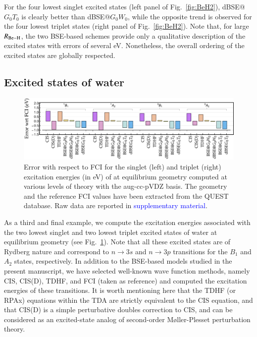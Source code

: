 \documentclass[aip,jcp,reprint,noshowkeys,superscriptaddress]{revtex4-1}
\newcommand{\SupMat}{\textcolor{blue}{supplementary material}}
\begin{document}
For the four lowest singlet excited states (left panel of Fig.~\ref{fig:BeH2}), dBSE@$G_0T_0$ is clearly better than dBSE@$G_0W_0$, while the opposite trend is observed for the four lowest triplet states (right panel of Fig.~\ref{fig:BeH2}).
Note that, for large $R_{\ce{Be-H}}$, the two BSE-based schemes provide only a qualitative description of the excited states with errors of several \si{\eV}.
Nonetheless, the overall ordering of the excited states are globally respected.

\subsection{Excited states of water}
\label{sec:H2O}

\begin{figure}
	\includegraphics[width=\linewidth]{fig6}
	\caption{Error with respect to FCI for the singlet (left) and triplet (right) excitation energies (in \si{\eV}) of  at equilibrium geometry computed at various levels of theory with the aug-cc-pVDZ basis.
	The geometry and the reference FCI values have been extracted from the QUEST database. \cite{Veril_2021}
	Raw data are reported in {\SupMat}.}
	\label{fig:H2O}
\end{figure}

As a third and final example, we compute the excitation energies associated with the two lowest singlet and two lowest triplet excited states of water at equilibrium geometry (see Fig.~\ref{fig:H2O}).
Note that all these excited states are of Rydberg nature and correspond to $n \to 3s$ and $n \to 3p$ transitions for the $B_1$ and $A_2$ states, respectively. \cite{Loos_2018a}
In addition to the BSE-based models studied in the present manuscript, we have selected well-known wave function methods, \cite{Bene_1971,Head-Gordon_1994,Head-Gordon_1995,Dreuw_2005} namely CIS, CIS(D), TDHF, and FCI (taken as reference) and computed the excitation energies of these transitions.
It is worth mentioning here that the TDHF (or RPAx) equations within the TDA are strictly equivalent to the CIS equation, \cite{Dreuw_2005} and that CIS(D) is a simple perturbative doubles correction to CIS, and can be considered as an excited-state analog of second-order M{\o}ller-Plesset perturbation theory. \cite{Head-Gordon_1994,Head-Gordon_1995}
\end{document}
